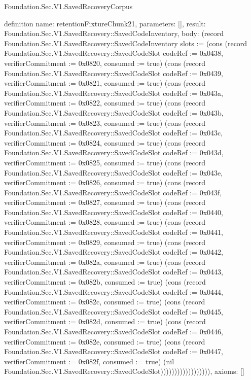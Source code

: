 \begin{lexlean}{Foundation.Sec.V1.SavedRecoveryCorpus}
\begin{semanticmodule}
definition{
  name: retentionFixtureChunk21,
  parameters: [],
  result: Foundation.Sec.V1.SavedRecovery::SavedCodeInventory,
  body: (record Foundation.Sec.V1.SavedRecovery::SavedCodeInventory {slots := (cons (record Foundation.Sec.V1.SavedRecovery::SavedCodeSlot {codeRef := 0x0438, verifierCommitment := 0x0820, consumed := true}) (cons (record Foundation.Sec.V1.SavedRecovery::SavedCodeSlot {codeRef := 0x0439, verifierCommitment := 0x0821, consumed := true}) (cons (record Foundation.Sec.V1.SavedRecovery::SavedCodeSlot {codeRef := 0x043a, verifierCommitment := 0x0822, consumed := true}) (cons (record Foundation.Sec.V1.SavedRecovery::SavedCodeSlot {codeRef := 0x043b, verifierCommitment := 0x0823, consumed := true}) (cons (record Foundation.Sec.V1.SavedRecovery::SavedCodeSlot {codeRef := 0x043c, verifierCommitment := 0x0824, consumed := true}) (cons (record Foundation.Sec.V1.SavedRecovery::SavedCodeSlot {codeRef := 0x043d, verifierCommitment := 0x0825, consumed := true}) (cons (record Foundation.Sec.V1.SavedRecovery::SavedCodeSlot {codeRef := 0x043e, verifierCommitment := 0x0826, consumed := true}) (cons (record Foundation.Sec.V1.SavedRecovery::SavedCodeSlot {codeRef := 0x043f, verifierCommitment := 0x0827, consumed := true}) (cons (record Foundation.Sec.V1.SavedRecovery::SavedCodeSlot {codeRef := 0x0440, verifierCommitment := 0x0828, consumed := true}) (cons (record Foundation.Sec.V1.SavedRecovery::SavedCodeSlot {codeRef := 0x0441, verifierCommitment := 0x0829, consumed := true}) (cons (record Foundation.Sec.V1.SavedRecovery::SavedCodeSlot {codeRef := 0x0442, verifierCommitment := 0x082a, consumed := true}) (cons (record Foundation.Sec.V1.SavedRecovery::SavedCodeSlot {codeRef := 0x0443, verifierCommitment := 0x082b, consumed := true}) (cons (record Foundation.Sec.V1.SavedRecovery::SavedCodeSlot {codeRef := 0x0444, verifierCommitment := 0x082c, consumed := true}) (cons (record Foundation.Sec.V1.SavedRecovery::SavedCodeSlot {codeRef := 0x0445, verifierCommitment := 0x082d, consumed := true}) (cons (record Foundation.Sec.V1.SavedRecovery::SavedCodeSlot {codeRef := 0x0446, verifierCommitment := 0x082e, consumed := true}) (cons (record Foundation.Sec.V1.SavedRecovery::SavedCodeSlot {codeRef := 0x0447, verifierCommitment := 0x082f, consumed := true}) (nil Foundation.Sec.V1.SavedRecovery::SavedCodeSlot)))))))))))))))))}),
  axioms: []
}


\end{semanticmodule}
\end{lexlean}
